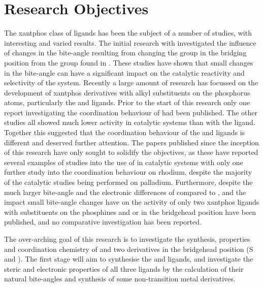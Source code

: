 \section{Research Objectives}

The xantphos class of ligands has been the subject of a number of studies, with interesting and varied results.  The initial research with \Phxantphos{} investigated the influence of changes in the bite-angle resulting from changing the group in the bridging position from the  group found in \Phxantphos.\cite{Kranenburg1995, Kranenburg1998, Kamer2001}  These studies have shown that small changes in the bite-angle can have a significant impact on the catalytic reactivity and selectivity of the system.  Recently a large amount of research has focussed on the development of xantphos derivatives with alkyl substituents on the phosphorus atoms, particularly the \iPrxantphos{} and \tBuxantphos{} ligands.  Prior to the start of this research only one report investigating the coordination behaviour of \tBuxantphos{} had been published.\cite{Partyka2010}  The other studies all showed much lower activity in catalytic systems than with the \Phxantphos{} ligand.\cite{Ohshima2009, Mispelaere2005, Dongol2007}   Together this suggested that the coordination behaviour of the \tBuxantphos{} and \Phxantphos{} ligands is different and deserved further attention.  The papers published since the inception of this research have only sought to solidify the objectives, as these have reported several examples of studies into the use of \tBuxantphos{} in catalytic systems with only one further study into the coordination behaviour on rhodium, despite the majority of the catalytic studies being performed on palladium.  Furthermore, despite the much larger bite-angle and the electronic differences of \tBuxantphos{} compared to \Phxantphos, and the impact small bite-angle changes have on the activity of \Phxantphos{} only two xantphos ligands with \tBu{} substituents on the phosphines and  or  in the bridgehead position have been published, and no comparative investigation has been reported.

The over-arching goal of this research is to investigate the synthesis, properties and coordination chemistry of \tBuxantphos{} and two derivatives in the bridgehead position (S and ).  The first stage will aim to synthesise the \tButhixantphos{} and \tBusixantphos{} ligands, and investigate the steric and electronic properties of all three \tBuxantphos{} ligands by the calculation of their natural bite-angles and synthesis of some non-transition metal derivatives.  

